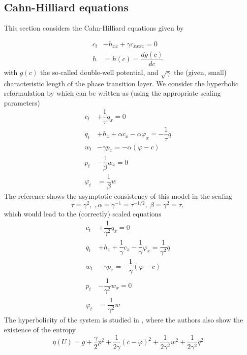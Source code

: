 \documentclass{article}
\theoremstyle{plain}
\theoremstyle{definition}
\numberwithin{theorem}{section}
\begin{document}
\subsection{Cahn-Hilliard equations}

This section considers the Cahn-Hilliard equations given by

\begin{subequations} \label{CaHi}
\begin{align}
c_t  & -  h_{xx} +\gamma c_{xxxx} =0\\
h &=h(c) = \dfrac{dg(c)}{dc}
\end{align}
\end{subequations}
with $g(c)$ the so-called  double-well potential, and $\sqrt{\gamma}$   the (given, small) characteristic length of  the phase transition layer.
We consider the hyperbolic reformulation by \cite{dhaouadi25} which can be written as (using the appropriate scaling parameters)
\begin{subequations} \label{hCaHi}
\begin{align}
c_t  &  +\dfrac{1}{\tau} q_x =0\\
q_t  &  + h_x +\alpha c_x- \alpha\varphi_x = - \dfrac{1}{\tau} q\\
w_t  &  -  \gamma p_x =  -\alpha (\varphi-c)\\
p_t  &  -   \dfrac{1}{\beta} w_x =0\\
\varphi_t &  =   \dfrac{1}{\beta} w 
\end{align}
\end{subequations}
The reference shows the asymptotic consistency of this model in the scaling 
$$\tau = \gamma^2,\;, \alpha=\gamma^{-1} = \tau^{-1/2},\; \beta =\gamma^2 = \tau,$$ 
which would lead to  the  (correctly) scaled equations
\begin{subequations} \label{hCaHi1}
\begin{align}
c_t  &  +\dfrac{1}{\gamma^2} q_x =0\\
q_t  &  + h_x +\dfrac{1}{\gamma} c_x- \dfrac{1}{\gamma}\varphi_x =  \dfrac{1}{\gamma^2} q\\
w_t  &  -  \gamma p_x = - \dfrac{1}{\gamma} (\varphi-c)\\
p_t  &  -   \dfrac{1}{\gamma^2} w_x =0\\
\varphi_t &  =   \dfrac{1}{\gamma^2} w 
\end{align}
\end{subequations}
The hyperbolicity of the system is studied in \cite{dhaouadi25}, where the authors also show the existence of the entropy
$$
\eta(U) = g +\dfrac{\gamma}{2}p^2 + \dfrac{1}{2\gamma } (c-\varphi)^2  + \dfrac{1}{2\gamma^2}w^2 +  \dfrac{1}{2\gamma^2}q^2
$$
\end{document}
